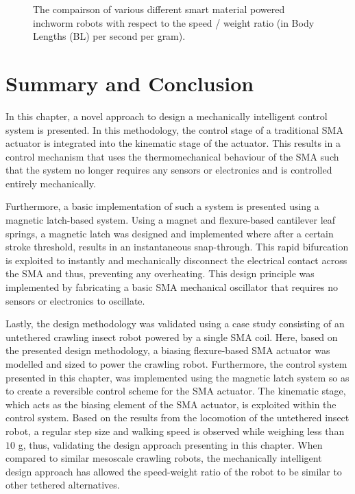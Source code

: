 \begin{figure}[hbt!] %
  \centering
  \resizebox{0.9\columnwidth}{!}{}
  \caption{The compairson of various different smart material powered inchworm robots with respect to the speed / weight ratio (in Body Lengths (BL) per second per gram).}
  \label{fig:inchworm-compare-speedweight-weight}
\end{figure}

\section{Summary and Conclusion}
In this chapter, a novel approach to design a mechanically intelligent control system is presented. In this methodology, the control stage of a traditional SMA actuator is integrated into the kinematic stage of the actuator. This results in a control mechanism that uses the thermomechanical behaviour of the SMA such that the system no longer requires any sensors or electronics and is controlled entirely mechanically.

Furthermore, a basic implementation of such a system is presented using a magnetic latch-based system. Using a magnet and flexure-based cantilever leaf springs, a magnetic latch was designed and implemented where after a certain stroke threshold, results in an instantaneous snap-through. This rapid bifurcation is exploited to instantly and mechanically disconnect the electrical contact across the SMA and thus, preventing any overheating. This design principle was implemented by fabricating a basic SMA mechanical oscillator that requires no sensors or electronics to oscillate.

Lastly, the design methodology was validated using a case study consisting of an untethered crawling insect robot powered by a single SMA coil. Here, based on the presented design methodology, a biasing flexure-based SMA actuator was modelled and sized to power the crawling robot. Furthermore, the control system presented in this chapter, was implemented using the magnetic latch system so as to create a reversible control scheme for the SMA actuator. The kinematic stage, which acts as the biasing element of the SMA actuator, is exploited within the control system. Based on the results from the locomotion of the untethered insect robot, a regular step size and walking speed is observed while weighing less than $10$ g, thus, validating the design approach presenting in this chapter. When compared to similar mesoscale crawling robots, the mechanically intelligent design approach has allowed the speed-weight ratio of the robot to be similar to other tethered alternatives.

